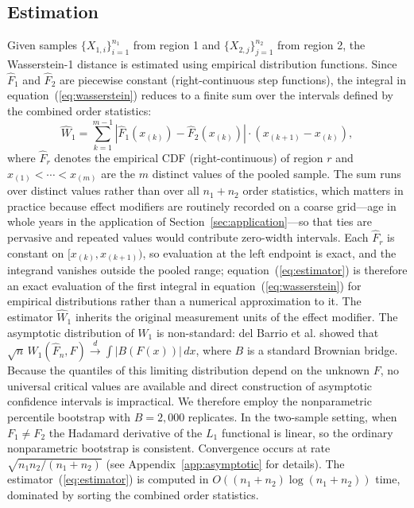 \documentclass[AMA,Times1COL]{WileyNJDv5}
\begin{document}
\subsection{Estimation}\label{sec:estimation}

Given samples $\{X_{1,i}\}_{i=1}^{n_1}$ from region 1 and $\{X_{2,j}\}_{j=1}^{n_2}$ from region 2, the Wasserstein-1 distance is estimated using empirical distribution functions. Since $\hat{F}_1$ and $\hat{F}_2$ are piecewise constant (right-continuous step functions), the integral in equation~(\ref{eq:wasserstein}) reduces to a finite sum over the intervals defined by the combined order statistics:
\begin{equation}
\widehat{W}_1 = \sum_{k=1}^{m-1} |\hat{F}_1(x_{(k)}) - \hat{F}_2(x_{(k)})| \cdot (x_{(k+1)} - x_{(k)}),
\label{eq:estimator}
\end{equation}
where $\hat{F}_r$ denotes the empirical CDF (right-continuous) of region $r$ and $x_{(1)} < \cdots < x_{(m)}$ are the $m$ distinct values of the pooled sample. The sum runs over distinct values rather than over all $n_1 + n_2$ order statistics, which matters in practice because effect modifiers are routinely recorded on a coarse grid---age in whole years in the application of Section~\ref{sec:application}---so that ties are pervasive and repeated values would contribute zero-width intervals. Each $\hat{F}_r$ is constant on $[x_{(k)}, x_{(k+1)})$, so evaluation at the left endpoint is exact, and the integrand vanishes outside the pooled range; equation~(\ref{eq:estimator}) is therefore an exact evaluation of the first integral in equation~(\ref{eq:wasserstein}) for empirical distributions rather than a numerical approximation to it. The estimator $\widehat{W}_1$ inherits the original measurement units of the effect modifier. The asymptotic distribution of $W_1$ is non-standard: del Barrio et al.\cite{delbarrio1999} showed that $\sqrt{n}\,W_1(\hat{F}_n, F) \xrightarrow{d} \int |B(F(x))|\,dx$, where $B$ is a standard Brownian bridge. Because the quantiles of this limiting distribution depend on the unknown $F$, no universal critical values are available and direct construction of asymptotic confidence intervals is impractical. We therefore employ the nonparametric percentile bootstrap with $B = 2{,}000$ replicates.\cite{efron1993} In the two-sample setting, when $F_1 \neq F_2$ the Hadamard derivative of the $L_1$ functional is linear, so the ordinary nonparametric bootstrap is consistent.\cite{sommerfeld2018} Convergence occurs at rate $\sqrt{n_1 n_2/(n_1+n_2)}$ (see Appendix~\ref{app:asymptotic} for details). The estimator~(\ref{eq:estimator}) is computed in $O((n_1 + n_2) \log(n_1 + n_2))$ time, dominated by sorting the combined order statistics.
\end{document}
